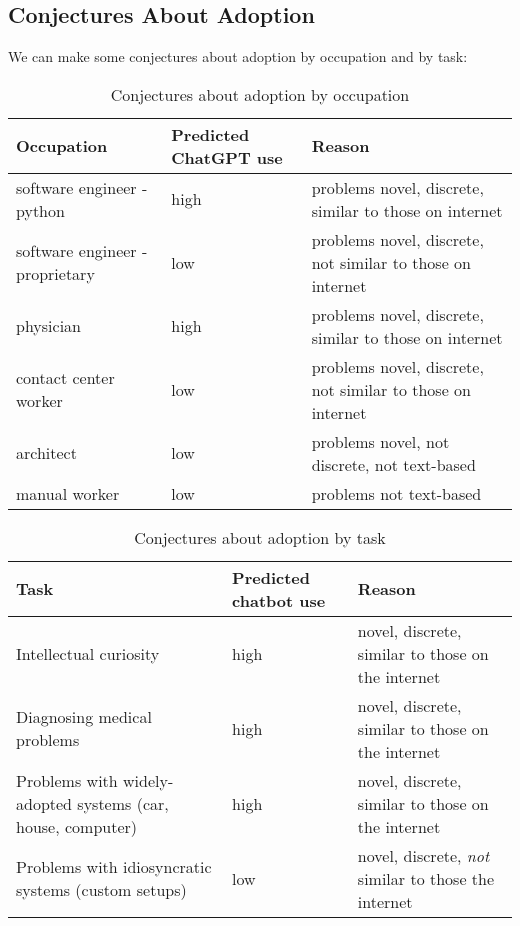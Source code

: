 \documentclass[\ifdraft draft\fi]{article}
\begin{document}
   \subsection{Conjectures About Adoption}

   We can make some conjectures about adoption by occupation and by task:

   \begin{table}[H]
   \centering
   \begin{tabular}{@{}p{5cm}p{2cm}p{5cm}@{}}
   \toprule
   \textbf{Occupation} & \textbf{Predicted ChatGPT use} & \textbf{Reason} \\
   \midrule
      software engineer - python & high & problems novel, discrete, similar to those on internet \\
      \midrule
      software engineer - proprietary & low & problems novel, discrete, not similar to those on internet \\
      \midrule
      physician & high & problems novel, discrete, similar to those on internet \\
      \midrule
      contact center worker & low & problems novel, discrete, not similar to those on internet\\
      \midrule
      architect & low & problems novel, not discrete, not text-based \\
      \midrule
      manual worker & low & problems not text-based \\
   \bottomrule
   \end{tabular}
   \captionsetup{justification=centering}
   \caption{Conjectures about adoption by occupation}
   \end{table}

   \begin{table}[H]
   \centering
   \begin{tabular}{@{}p{5cm}p{2cm}p{5cm}@{}}
   \toprule
   \textbf{Task} & \textbf{Predicted chatbot use} & \textbf{Reason} \\
   \midrule
      Intellectual curiosity & high & novel, discrete, similar to those on the internet \\
      \midrule
      Diagnosing medical problems & high & novel, discrete, similar to those on the internet \\
      \midrule
      Problems with widely-adopted systems (car, house, computer) & high & novel, discrete, similar to those on the internet \\
      \midrule
      Problems with idiosyncratic systems (custom setups) & low & novel, discrete, \textit{not} similar to those the internet \\
   \bottomrule
   \end{tabular}
   \captionsetup{justification=centering}
   \caption{Conjectures about adoption by task}
   \end{table}
\end{document}
